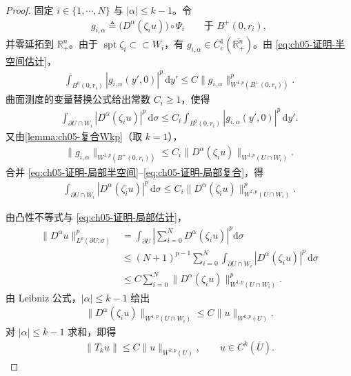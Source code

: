 \documentclass[../../main.tex]{subfiles}%
\begin{document}
\begin{proof}
固定 $i\in\{1,\cdots,N\}$ 与 $|\alpha|\leqslant k-1$。令
\begin{align*}
g_{i,\alpha}\triangleq\bigl(D^{\alpha}(\zeta_{i}u)\bigr)\circ\Psi_{i}
\qquad\text{于 }B^{+}(0,r_{i}),
\end{align*}
并零延拓到 $\mathbb{R}^{n}_{+}$。由于 $\operatorname{spt}\zeta_{i}\subset\subset W_{i}$，有 $g_{i,\alpha}\in C^{1}_{c}(\overline{\mathbb{R}^{n}_{+}})$。由 \eqref{eq:ch05-证明-半空间估计}，
\begin{align}
\int_{B^{0}(0,r_{i})}|g_{i,\alpha}(y',0)|^{p}\,\mathrm{d}y'
\leqslant
C\|g_{i,\alpha}\|_{W^{1,p}(B^{+}(0,r_{i}))}^{p}.
\label{eq:ch05-证明-局部半空间}
\end{align}
曲面测度的变量替换公式给出常数 $C_{i}\geqslant1$，使得
\begin{align}
\int_{\partial U\cap W_{i}}|D^{\alpha}(\zeta_{i}u)|^{p}\,\mathrm{d}\sigma
\leqslant
C_{i}\int_{B^{0}(0,r_{i})}|g_{i,\alpha}(y',0)|^{p}\,\mathrm{d}y'.
\label{eq:ch05-证明-局部边界}
\end{align}
又由\cref{lemma:ch05-复合Wkp}（取 $k=1$），
\begin{align}
\|g_{i,\alpha}\|_{W^{1,p}(B^{+}(0,r_{i}))}
\leqslant
C_{i}\|D^{\alpha}(\zeta_{i}u)\|_{W^{1,p}(U\cap W_{i})}.
\label{eq:ch05-证明-局部复合}
\end{align}
合并 \eqref{eq:ch05-证明-局部半空间}--\eqref{eq:ch05-证明-局部复合}，得
\begin{align}
\int_{\partial U\cap W_{i}}|D^{\alpha}(\zeta_{i}u)|^{p}\,\mathrm{d}\sigma
\leqslant
C_{i}\|D^{\alpha}(\zeta_{i}u)\|_{W^{1,p}(U\cap W_{i})}^{p}.
\label{eq:ch05-证明-局部估计}
\end{align}

由凸性不等式与 \eqref{eq:ch05-证明-局部估计}，
\begin{align*}
\|D^{\alpha}u\|_{L^{p}(\partial U;\sigma)}^{p}
&=\int_{\partial U}\left|\sum_{i=0}^{N}D^{\alpha}(\zeta_{i}u)\right|^{p}\mathrm{d}\sigma\\
&\leqslant (N+1)^{p-1}\sum_{i=0}^{N}\int_{\partial U\cap W_{i}}|D^{\alpha}(\zeta_{i}u)|^{p}\,\mathrm{d}\sigma\\
&\leqslant C\sum_{i=0}^{N}\|D^{\alpha}(\zeta_{i}u)\|_{W^{1,p}(U\cap W_{i})}^{p}.
\end{align*}
由 Leibniz 公式，$|\alpha|\leqslant k-1$ 给出
\begin{align*}
\|D^{\alpha}(\zeta_{i}u)\|_{W^{1,p}(U\cap W_{i})}
\leqslant C\|u\|_{W^{k,p}(U)}.
\end{align*}
对 $|\alpha|\leqslant k-1$ 求和，即得
\begin{align}
\|T_{k}u\|
\leqslant
C\|u\|_{W^{k,p}(U)},
\qquad u\in C^{k}(\overline{U}).
\label{eq:ch05-证明-Ck估计}
\end{align}


\end{proof}
\end{document}
